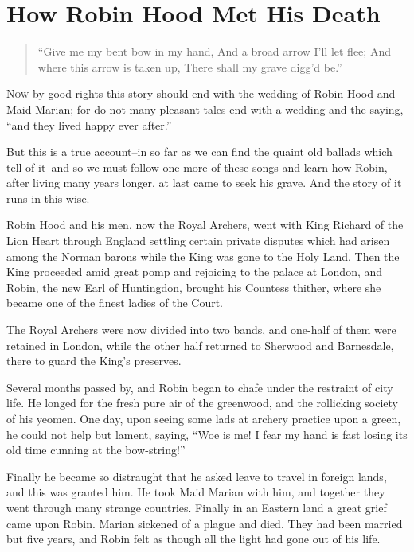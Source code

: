 \chapter{How Robin Hood Met His Death}

\begin{quote}
“Give me my bent bow in my hand,
And a broad arrow I’ll let flee;
And where this arrow is taken up,
There shall my grave digg’d be.”
\end{quote}

\lettrine{N}{ow} by good rights this story should end with the wedding of Robin Hood
and Maid Marian; for do not many pleasant tales end with a wedding and
the saying, ``and they lived happy ever after.''

But this is a true account--in so far as we can find the quaint old
ballads which tell of it--and so we must follow one more of these songs
and learn how Robin, after living many years longer, at last came to
seek his grave. And the story of it runs in this wise.

Robin Hood and his men, now the Royal Archers, went with King Richard of
the Lion Heart through England settling certain private disputes which
had arisen among the Norman barons while the King was gone to the Holy
Land. Then the King proceeded amid great pomp and rejoicing to the
palace at London, and Robin, the new Earl of Huntingdon, brought his
Countess thither, where she became one of the finest ladies of the
Court.

The Royal Archers were now divided into two bands, and one-half of them
were retained in London, while the other half returned to Sherwood and
Barnesdale, there to guard the King's preserves.

Several months passed by, and Robin began to chafe under the restraint
of city life. He longed for the fresh pure air of the greenwood, and the
rollicking society of his yeomen. One day, upon seeing some lads at
archery practice upon a green, he could not help but lament, saying,
``Woe is me! I fear my hand is fast losing its old time cunning at the
bow-string!''

Finally he became so distraught that he asked leave to travel in foreign
lands, and this was granted him. He took Maid Marian with him, and
together they went through many strange countries. Finally in an Eastern
land a great grief came upon Robin. Marian sickened of a plague and
died. They had been married but five years, and Robin felt as though all
the light had gone out of his life.

